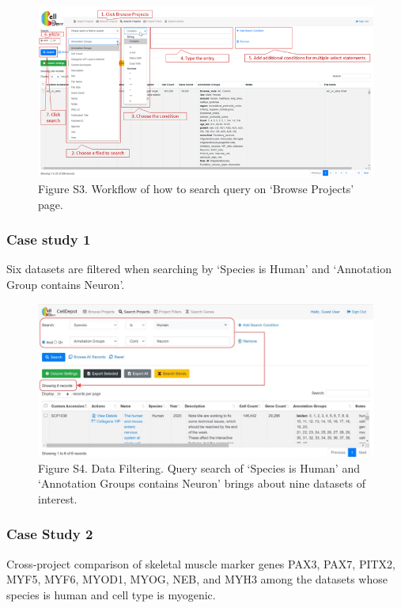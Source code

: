 \documentclass[
]{book}
\begin{document}
\begin{figure}
\centering
\includegraphics{figures/S6.png}
\caption{Figure S3. Workflow of how to search query on `Browse Projects' page.}
\end{figure}

\hypertarget{case-study-1}{%
\subsubsection{Case study 1}\label{case-study-1}}

Six datasets are filtered when searching by `Species is Human' and `Annotation Group contains Neuron'.

\begin{figure}
\centering
\includegraphics{figures/S1.jpg}
\caption{Figure S4. Data Filtering. Query search of `Species is Human' and `Annotation Groups contains Neuron' brings about nine datasets of interest.}
\end{figure}

\hypertarget{case-study-2}{%
\subsubsection{Case Study 2}\label{case-study-2}}

Cross-project comparison of skeletal muscle marker genes PAX3, PAX7, PITX2, MYF5, MYF6, MYOD1, MYOG, NEB, and MYH3 among the datasets whose species is human and cell type is myogenic.
\end{document}
